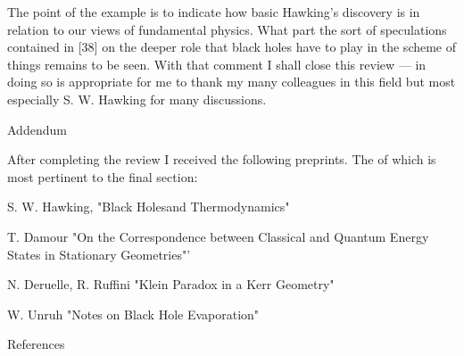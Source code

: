 The point of the example is to indicate how basic Hawking's discovery is
in relation to our views of fundamental physics. 
What part the sort of speculations contained in [38] on the deeper
role that black holes have to play in the
scheme of things remains to be seen. With that comment I shall close this review
--- in doing so is appropriate for me to thank my many colleagues in this field
but most especially S. W. Hawking for many discussions.


\bigskip
\centerline{\sc Addendum}
\bigskip

After completing the review I received the following preprints. The
of which is most pertinent to the final section:

\bigskip

S. W. Hawking, "Black Holesand Thermodynamics"

T. Damour "On the Correspondence between Classical and Quantum Energy
States in Stationary Geometries"'

N. Deruelle, R. Ruffini "Klein Paradox in a Kerr Geometry"

W. Unruh "Notes on Black Hole Evaporation"

\newpage

\renewcommand{\section}[2]{}%

\bigskip
\bigskip
\centerline{\sc References}

